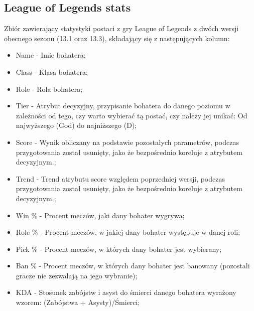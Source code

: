 \documentclass[oneside]{book}
\begin{document}
\subsection{League of Legends stats}
Zbiór zawierający statystyki postaci z gry League of Legends z 
dwóch wersji obecnego sezonu (13.1 oraz 13.3), składający się z 
następujących kolumn:
\begin{itemize}
    \item Name - Imie bohatera;
    \item Class - Klasa bohatera;
    \item Role - Rola bohatera;
    \item Tier - Atrybut decyzyjny, 
    przypisanie bohatera do danego 
    poziomu w zależności od tego, 
    czy warto wybierać tą postać, 
    czy należy jej unikać: 
    Od najwyższego (God) do najniższego (D);
    \item Score - Wynik obliczany na podstawie 
    pozostałych parametrów, 
    podczas przygotowania został 
    usunięty, jako że bezpośrednio 
    koreluje z atrybutem decyzyjnym.;
    \item Trend - Trend atrybutu score względem 
    poprzedniej wersji, 
    podczas przygotowania został 
    usunięty, jako że bezpośrednio 
    koreluje z atrybutem decyzyjnym.;
    \item Win \% - Procent meczów, 
    jaki dany bohater wygrywa;
    \item Role \% - Procent meczów, 
    w jakiej dany bohater występuje w danej roli;
    \item Pick \% - Procent meczów, 
    w których dany bohater jest wybierany;
    \item Ban \% - Procent meczów, 
    w których dany bohater jest banowany (pozostali gracze nie zezwalają na jego wybranie);
    \item KDA - Stosunek zabójstw 
    i asyst do śmierci danego 
    bohatera wyrażony wzorem: 
    (Zabójstwa + Asysty)/Śmierci;
\end{itemize}
\end{document}
